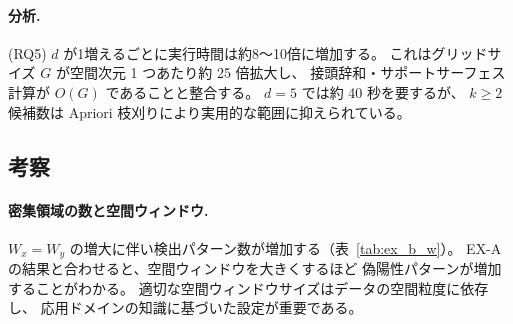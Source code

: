 \paragraph{分析.}
(RQ5)
$d$ が1増えるごとに実行時間は約8〜10倍に増加する。
これはグリッドサイズ $G$ が空間次元 1 つあたり約 25 倍拡大し、
接頭辞和・サポートサーフェス計算が $O(G)$ であることと整合する。
$d{=}5$ では約 40 秒を要するが、
$k{\geq}2$ 候補数は Apriori 枝刈りにより実用的な範囲に抑えられている。

\subsection{考察}\label{sec:discussion}

\paragraph{密集領域の数と空間ウィンドウ.}
$W_x = W_y$ の増大に伴い検出パターン数が増加する（表~\ref{tab:ex_b_w}）。
EX-A の結果と合わせると、空間ウィンドウを大きくするほど
偽陽性パターンが増加することがわかる。
適切な空間ウィンドウサイズはデータの空間粒度に依存し、
応用ドメインの知識に基づいた設定が重要である。
